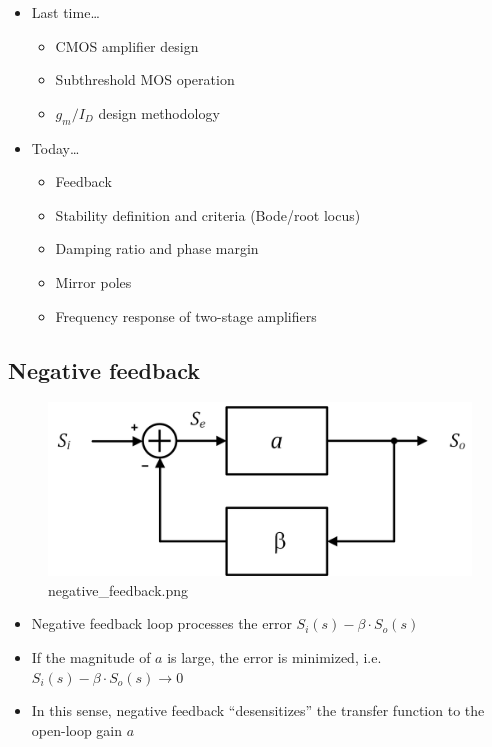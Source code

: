 \documentclass[11pt]{article}
\providecommand{\tightlist}{%
      \setlength{\itemsep}{0pt}\setlength{\parskip}{0pt}}
\begin{document}
    \begin{itemize}
\tightlist
\item
  Last time\ldots{}

  \begin{itemize}
  \tightlist
  \item
    CMOS amplifier design
  \item
    Subthreshold MOS operation
  \item
    \(g_m/I_D\) design methodology
  \end{itemize}
\item
  Today\ldots{}

  \begin{itemize}
  \tightlist
  \item
    Feedback
  \item
    Stability definition and criteria (Bode/root locus)
  \item
    Damping ratio and phase margin
  \item
    Mirror poles
  \item
    Frequency response of two-stage amplifiers
  \end{itemize}
\end{itemize}

    \hypertarget{negative-feedback}{%
\subsection{Negative feedback}\label{negative-feedback}}

    \begin{figure}
\centering
\includegraphics{negative_feedback.png}
\caption{negative\_feedback.png}
\end{figure}

    \begin{itemize}
\tightlist
\item
  Negative feedback loop processes the error
  \(S_i(s) -\beta \cdot S_o(s)\)
\item
  If the magnitude of \(a\) is large, the error is minimized,
  i.e.~\(S_i(s) - \beta \cdot S_o(s) \rightarrow 0\)
\item
  In this sense, negative feedback ``desensitizes'' the transfer
  function to the open-loop gain \(a\)
\end{itemize}
\end{document}
